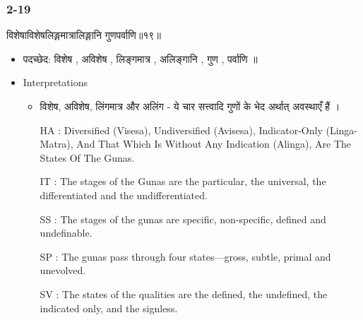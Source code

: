 \begin{frame}[fragile]\frametitle{2-19}
\begin{sanskrit}
विशेषाविशेषलिङ्गमात्रालिङ्गानि गुणपर्वाणि॥१९॥
\end{sanskrit}

	\begin{itemize}
	\item पदच्छेद: विशेष , अविशेष , लिङ्गमात्र , अलिङ्गानि , गुण , पर्वाणि ॥
	\item Interpretations
		\begin{itemize}
		\item विशेष, अविशेष, लिंगमात्र और अलिंग - ये चार सत्त्वादि गुणों के भेद अर्थात् अवस्थाएँ हैं ।
		\item [HA]: Diversified (Visesa), Undiversified (Avisesa), Indicator-Only (Linga-Matra), And That Which Is Without Any Indication (Alinga), Are The States Of The Gunas.
		\item [IT]: The stages of the Gunas are the particular, the universal, the differentiated and the undifferentiated.
		\item [SS]: The stages of the gunas are specific, non-specific, defined and undefinable.
		\item [SP]: The gunas pass through four states—gross, subtle, primal and unevolved.
		\item [SV]: The states of the qualities are the defined, the undefined, the indicated only, and the signless. 
		\end{itemize}
	\end{itemize}
	
\end{frame}

